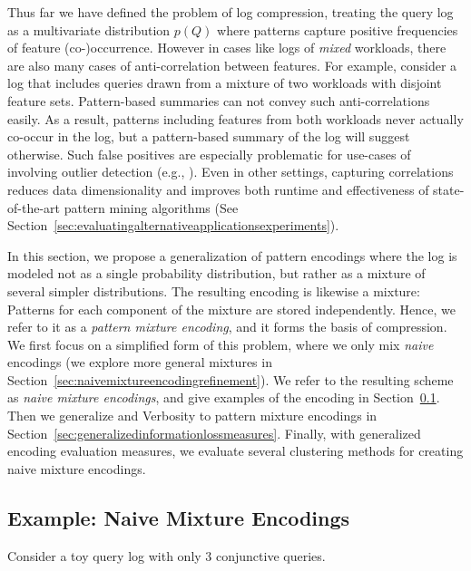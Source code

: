 \label{sec:patternmixtureencodings}
Thus far we have defined the problem of log compression, treating the query log as a multivariate distribution $p(Q)$ where patterns capture positive frequencies of feature (co-)occurrence.
However in cases like logs of \textit{mixed} workloads, there are also many cases of anti-correlation between features.
For example, consider a log that includes queries drawn from a mixture of two workloads with disjoint feature sets.
Pattern-based summaries can not convey such anti-correlations easily.
As a result, patterns including features from both workloads never actually co-occur in the log, but a pattern-based summary of the log will suggest otherwise.
Such false positives are especially problematic for use-cases of \systemnameone involving outlier detection (e.g., \cite{DBLP:conf/trustcom/KulUC18}).
Even in other settings, capturing correlations reduces data dimensionality and improves both runtime and effectiveness of state-of-the-art pattern mining algorithms (See Section~\ref{sec:evaluatingalternativeapplicationsexperiments}).

In this section, we propose a generalization of pattern encodings where the log is modeled not as a single probability distribution, but rather as a mixture of several simpler distributions.
The resulting encoding is likewise a mixture: Patterns for each component of the mixture are stored independently.
Hence, we refer to it as a \emph{pattern mixture encoding}, and it forms the basis of \systemnameone compression.
We first focus on a simplified form of this problem, where we only mix \emph{naive} encodings (we explore more general mixtures in Section~\ref{sec:naivemixtureencodingrefinement}).
We refer to the resulting scheme as \textit{naive mixture encodings}, and give examples of the encoding in Section~\ref{sec:naivemixtureencoding}.
Then we generalize \errorname and Verbosity to pattern mixture encodings in Section~\ref{sec:generalizedinformationlossmeasures}.
Finally, with generalized encoding evaluation measures, we evaluate several clustering methods for creating naive mixture encodings.

\subsection{Example: Naive Mixture Encodings}
\label{sec:naivemixtureencoding}
\noindent Consider a toy query log with only 3 conjunctive queries. \\[-5mm]

